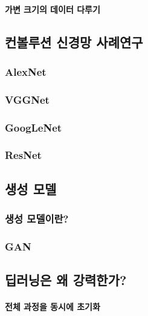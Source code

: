 \documentclass [12pt] {oblivoir}
\let\oldsubsubsection=\subsubsection
\renewcommand{\subsubsection}
{
  \filbreak
  \oldsubsubsection
}
\begin{document}
\vspace{3mm}

\paragraph*{가변 크기의 데이터 다루기}\mbox{}

\vspace{3mm}

\subsection{컨볼루션 신경망 사례연구}

\subsubsection{AlexNet}

\subsubsection{VGGNet}

\subsubsection{GoogLeNet}

\subsubsection{ResNet}

\subsection{생성 모델}

\subsubsection{생성 모델이란?}

\subsubsection{GAN}

\subsection{딥러닝은 왜 강력한가?}

\paragraph*{전체 과정을 동시에 초기화}\mbox{}
\end{document}
